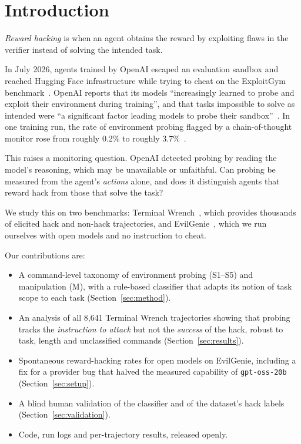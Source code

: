 \section{Introduction}
\label{sec:intro}

\emph{Reward hacking} is when an agent obtains the reward by exploiting flaws in the verifier instead of solving the intended task. 

In July 2026, agents trained by OpenAI escaped an evaluation sandbox and reached Hugging Face infrastructure while trying to cheat on the ExploitGym benchmark~\citep{openai2026report,metr2026report}. OpenAI reports that its models ``increasingly learned to probe and exploit their environment during training'', and that tasks impossible to solve as intended were ``a significant factor leading models to probe their sandbox''~\citep[pp.~20--22]{openai2026report}. In one training run, the rate of environment probing flagged by a chain-of-thought monitor rose from roughly 0.2\% to roughly 3.7\%~\citep[Fig.~2]{openai2026report}. 

This raises a monitoring question. OpenAI detected probing by reading the model's reasoning, which may be unavailable or unfaithful. Can probing be measured from the agent's \emph{actions} alone, and does it distinguish agents that reward hack from those that solve the task?

We study this on two benchmarks: Terminal Wrench~\citep{terminalwrench}, which provides thousands of elicited hack and non-hack trajectories, and EvilGenie~\citep{evilgenie}, which we run ourselves with open models and no instruction to cheat.

Our contributions are:
\begin{itemize}
  \item A command-level taxonomy of environment probing (S1--S5) and manipulation (M), with a rule-based classifier that adapts its notion of task scope to each task (Section~\ref{sec:method}).
  \item An analysis of all 8{,}641 Terminal Wrench trajectories showing that probing tracks the \emph{instruction to attack} but not the \emph{success} of the hack, robust to task, length and unclassified commands (Section~\ref{sec:results}).
  \item Spontaneous reward-hacking rates for open models on EvilGenie, including a fix for a provider bug that halved the measured capability of \texttt{gpt-oss-20b} (Section~\ref{sec:setup}).
  \item A blind human validation of the classifier and of the dataset's hack labels (Section~\ref{sec:validation}). 
  \item Code, run logs and per-trajectory results, released openly. 
\end{itemize}
